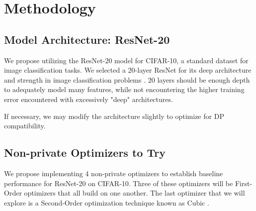 \documentclass{article}
\begin{document}
    \section{Methodology}\label{sec:methodology}

    \subsection{Model Architecture: ResNet-20}\label{subsec:model-architecture:-resnet-20}

    We propose utilizing the ResNet-20 model \cite{Idelbayev_ResNet20_CIFAR10} for CIFAR-10,
    a standard dataset for image classification tasks.
    We selected a 20-layer ResNet for its deep architecture and strength in image classification problems \cite{DBLP:journals/corr/HeZRS15}. 20
    layers should be enough depth to adequately model many features, while not encountering the higher training error encountered
    with excessively "deep" architectures. \cite{DBLP:journals/corr/HeZRS15}

    If necessary, we may modify the architecture slightly to optimize for DP compatibility.

    \subsection{Non-private Optimizers to Try}\label{subsec:non-private-optimizers-to-try}
    We propose implementing 4 non-private optimizers to establish baseline performance for ResNet-20 on CIFAR-10. Three of these optimizers will be First-Order optimizers
    that all build on one another. The last optimizer that we will explore is a Second-Order optimization technique known as Cubic .
\end{document}
